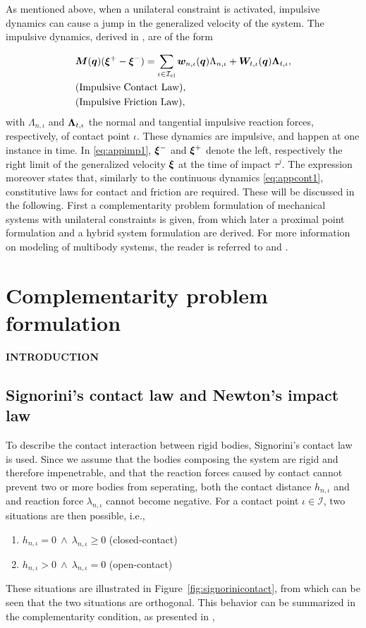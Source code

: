\documentclass[../DC2017114Bouma.tex]{subfiles}
\begin{document}
As mentioned above, when a unilateral constraint is activated, impulsive dynamics can cause a jump in the generalized velocity of the system. The impulsive dynamics, derived in \cite[Section 5.4]{Leine2008}, are of the form

\begin{align}
&{\boldsymbol{M}}({\boldsymbol{q}})(\boldsymbol{\xi}^+ - \boldsymbol{\xi}^-) = \sum_{\iota\in\mathcal{I}_{\text{cl}}} {\boldsymbol{w}}_{n,\iota}({\boldsymbol{q}})\Lambda_{n,\iota} + {\boldsymbol{W}}_{t,\iota}({\boldsymbol{q}})\boldsymbol{\Lambda}_{t,\iota}, \label{eq:appimp1}\\
&\text{(Impulsive Contact Law)},\nonumber\\
&\text{(Impulsive Friction Law)},\nonumber
\end{align}
with $\Lambda_{n,\iota}$ and $\boldsymbol{\Lambda}_{t,\iota}$ the normal and tangential impulsive reaction forces, respectively, of contact point $\iota$. These dynamics are impulsive, and happen at one instance in time. In \eqref{eq:appimp1}, $\boldsymbol{\xi}^-$ and $\boldsymbol{\xi}^+$ denote the left, respectively the right limit of the generalized velocity $\boldsymbol{\xi}$ at the time of impact $\tau^j$. The expression moreover states that, similarly to the continuous dynamics \eqref{eq:appcont1}, constitutive laws for contact and friction are required. These will be discussed in the following. First a complementarity problem formulation of mechanical systems with unilateral constraints is given, from which later a proximal point formulation and a hybrid system formulation are derived. For more information on modeling of multibody systems, the reader is referred to \cite{Leine2008} and \cite{Wouw2016}.

\section{Complementarity problem formulation}\label{sec:comp}
\textbf{INTRODUCTION}
\subsection{Signorini's contact law and Newton's impact law}\label{sec:2cont}
To describe the contact interaction between rigid bodies, Signorini's contact law is used. Since we assume that the bodies composing the system are rigid and therefore impenetrable, and that the reaction forces caused by contact cannot prevent two or more bodies from seperating, both the contact distance $h_{n,\iota}$ and and reaction force $\lambda_{n,\iota}$ cannot become negative. For a contact point $\iota\in\mathcal{I}$, two situations are then possible, i.e.,
\begin{enumerate}
\item $h_{n,\iota}=0\ \wedge\ \lambda_{n,\iota} \geq 0$ (closed-contact)
\item $h_{n,\iota}>0\ \wedge\ \lambda_{n,\iota} = 0$ (open-contact)
\end{enumerate}
These situations are illustrated in Figure~\ref{fig:signorinicontact}, from which can be seen that the two situations are orthogonal. This behavior can be summarized in the complementarity condition, as presented in \cite[Section 5.3.1]{Leine2008},
\end{document}
